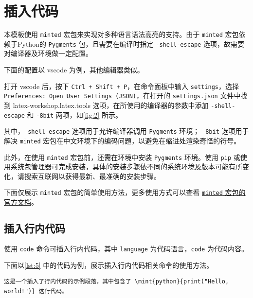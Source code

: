 \documentclass[a4paper]{article}
\begin{document}
\section{插入代码}

本模板使用 \texttt{minted} 宏包来实现对多种语言语法高亮的支持。由于 \texttt{minted} 宏包依赖于Python的 \texttt{Pygments} 包，且需要在编译时指定 \texttt{-shell-escape} 选项，故需要对编译器及环境做一定配置。

下面的配置以 vscode 为例，其他编辑器类似。

打开 vscode 后，按下 \texttt{Ctrl + Shift + P}，在命令面板中输入 \texttt{settings}，选择 \texttt{Preferences: Open User Settings (JSON)}，在打开的 \texttt{settings.json} 文件中找到 latex-workshop.latex.tools 选项，在所使用的编译器的参数中添加 \texttt{-shell-escape} 和 \texttt{-8bit} 两项，如\cref{fig:2} 所示。

其中，\texttt{-shell-escape} 选项用于允许编译器调用 \texttt{Pygments} 环境； \texttt{-8bit} 选项用于解决 \texttt{minted} 宏包在中文环境下的编码问题，以避免在缩进处渲染奇怪的符号。

此外，在使用 \texttt{minted} 宏包前，还需在环境中安装 \texttt{Pygments} 环境。使用 \texttt{pip} 或使用系统包管理器可完成安装，具体的安装步骤依不同的系统环境及版本可能有所变化，请搜索互联网以获得最新、最准确的安装步骤。

下面仅展示 \texttt{minted} 宏包的简单使用方法，更多使用方式可以查看 \href{https://mirror.math.princeton.edu/pub/CTAN/macros/latex/contrib/minted/minted.pdf}{\texttt{minted} 宏包的官方文档}。

\subsection{插入行内代码}

使用 \texttt{\texttt{code}} 命令可插入行内代码，其中 \texttt{language} 为代码语言，\texttt{code} 为代码内容。

下面以\cref{lst:5} 中的代码为例，展示插入行内代码相关命令的使用方法。

\begin{center}
    \label{lst:5}
    \begin{verbatim}
这是一个插入了行内代码的示例段落，其中包含了 \mint{python}{print("Hello, world!")} 这行代码。
    \end{verbatim}
\end{center}
\end{document}
